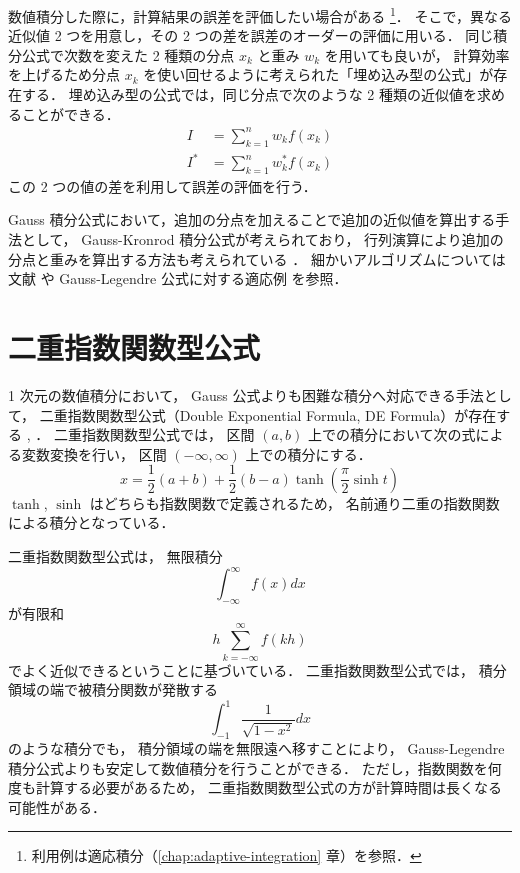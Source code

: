 数値積分した際に，計算結果の誤差を評価したい場合がある
\footnote{利用例は適応積分（\ref{chap:adaptive-integration} 章）を参照．}．
そこで，異なる近似値 2 つを用意し，その 2 つの差を誤差のオーダーの評価に用いる．
同じ積分公式で次数を変えた 2 種類の分点 $x_k$ と重み $w_k$ を用いても良いが，
計算効率を上げるため分点 $x_k$ を使い回せるように考えられた「埋め込み型の公式」が存在する．
埋め込み型の公式では，同じ分点で次のような 2 種類の近似値を求めることができる．
\begin{align}
    I   & = \sum_{k = 1}^n w_k f(x_k)   \\
    I^* & = \sum_{k = 1}^n w_k^* f(x_k)
\end{align}
この 2 つの値の差を利用して誤差の評価を行う．

Gauss 積分公式において，追加の分点を加えることで追加の近似値を算出する手法として，
Gauss-Kronrod 積分公式が考えられており，
行列演算により追加の分点と重みを算出する方法も考えられている
\cite{Laurie1997}．
細かいアルゴリズムについては文献 \cite{Laurie1997} や
Gauss-Legendre 公式に対する適応例 \cite{NumericalCollectionCpp} を参照．

\section{二重指数関数型公式}

1 次元の数値積分において，
Gauss 公式よりも困難な積分へ対応できる手法として，
二重指数関数型公式（Double Exponential Formula, DE Formula）が存在する
\cite[6.1 節 (b)]{Mori1993}, \cite[Section 4.5]{Press2007}．
二重指数関数型公式では，
区間 $(a, b)$ 上での積分において次の式による変数変換を行い，
区間 $(-\infty, \infty)$ 上での積分にする．
\begin{equation}
    x = \frac{1}{2}(a + b) + \frac{1}{2}(b - a) \tanh \left(\frac{\pi}{2} \sinh{t}\right)
\end{equation}
$\tanh$, $\sinh$ はどちらも指数関数で定義されるため，
名前通り二重の指数関数による積分となっている．

二重指数関数型公式は，
無限積分
\begin{equation}
    \int_{-\infty}^{\infty} f(x) dx
\end{equation}
が有限和
\begin{equation}
    h \sum_{k = -\infty}^{\infty} f(kh)
\end{equation}
でよく近似できるということに基づいている\cite[6.1 節 (b)]{Mori1993}．
二重指数関数型公式では，
積分領域の端で被積分関数が発散する
\begin{equation}
    \int_{-1}^{1} \frac{1}{\sqrt{1-x^2}} dx
\end{equation}
のような積分でも，
積分領域の端を無限遠へ移すことにより，
Gauss-Legendre 積分公式よりも安定して数値積分を行うことができる．
ただし，指数関数を何度も計算する必要があるため，
二重指数関数型公式の方が計算時間は長くなる可能性がある．

